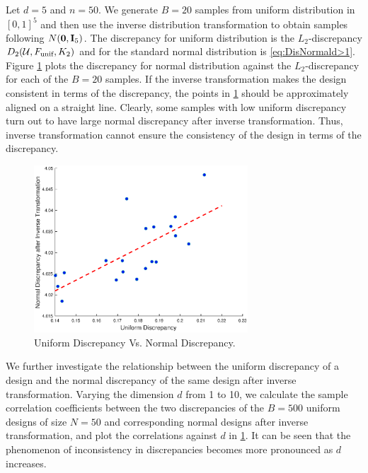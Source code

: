 \documentclass[graybox]{svmult}
\newcommand{\Udes}{\mathcal{U}}
\newcommand{\unif}{\textup{unif}}
\begin{document}
Let $d=5$ and $n=50$. 
We generate $B=20$ samples from uniform distribution in $[0,1]^5$ and then use the inverse distribution transformation to obtain samples following $N({\bf 0}, {\bf I}_5)$. 
The discrepancy for uniform distribution is the $L_2$-discrepancy $D_2(\Udes,F_\unif,K_2)$ and for the standard normal distribution is \eqref{eq:DisNormald>1}. 
Figure \ref{fig:UniVsNormDisc} plots the discrepancy for normal distribution against the $L_2$-discrepancy for each of the $B=20$ samples. 
If the inverse transformation makes the design consistent in terms of the discrepancy, the points in \ref{fig:UniVsNormDisc} should be approximately aligned on a straight line. 
Clearly, some samples with low uniform discrepancy turn out to have large normal discrepancy after inverse transformation.
Thus, inverse transformation cannot ensure the consistency of the design in terms of the discrepancy. 

\begin{figure}[ht]
\begin{center}
\includegraphics[width=8cm]{d5n50.eps}
\caption{Uniform Discrepancy Vs. Normal Discrepancy. \label{fig:UniVsNormDisc}}
\end{center}
\end{figure}

We further investigate the relationship between the uniform discrepancy of a design and the normal discrepancy of the same design after inverse transformation.
Varying the dimension $d$ from 1 to 10, we calculate the sample correlation coefficients between the two discrepancies of the $B=500$ uniform designs of size $N=50$ and corresponding normal designs after inverse transformation, and plot the correlations against $d$ in \ref{fig:UniVsNormDisc}. 
It can be seen that the phenomenon of inconsistency in discrepancies becomes more pronounced as $d$ increases.
\end{document}
